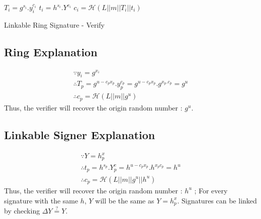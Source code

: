 \documentclass[11pt]{article}
\begin{document}
\begin{algorithm}
\DontPrintSemicolon
{}
 {
  $T_i = g^{s_i} . y_i^{c_i}$\;
  $t_i = h^{s_i} . Y^{c_i}$\;
  $c_i = \mathcal{H}(L || m || T_i || t_i)$\;
}
\;
\caption{Linkable Ring Signature - Verify}
\label{algo:linkable-verify}
\end{algorithm}

\subsection{Ring Explanation}
\begin{gather*}
\because y_i = g^{x_i} \\
\therefore T_p = g^{u-c_{p}x_{p}} . y_{p}^{c_p} = g^{u-c_{p}x_{p}} . g^{x_p.c_p} = g^u \\
\therefore c_p = \mathcal{H}(L || m || g^u)
\end{gather*}
Thus, the verifier will recover the origin random number : $g^u$.

\subsection{Linkable Signer Explanation}
\begin{gather*}
\because Y = h^x_p \\
\therefore t_p = h^{s_p} . Y^c_p = h^{u - c_p x_p} . h^{x_p c_p} = h^u \\
\therefore c_p = \mathcal{H}(L || m || g^u || h^u)
\end{gather*}
Thus, the verifier will recover the origin random number : $h^u$ ; For every signature with the same $h$, $Y$ will be the same as $Y = h^x_p$. Signatures can be linked by checking $\Delta{Y} \stackrel{?}{=} Y$.
\end{document}

